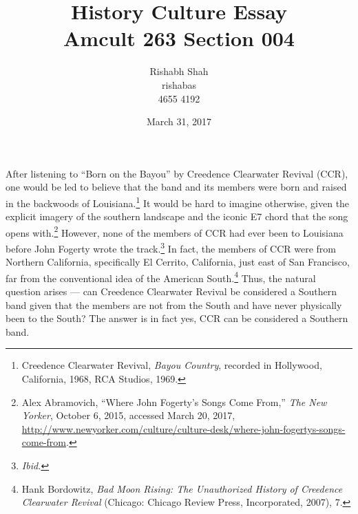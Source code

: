 \documentclass[10pt]{article}
\begin{document}
\title{
	History Culture Essay\\
	Amcult 263 Section 004
	}

\author{
	Rishabh Shah\\
	rishabas\\
	4655 4192\\}

\date{March 31, 2017}

\maketitle
\thispagestyle{empty}

\newpage
\clearpage
{}
\doublespacing

After listening to ``Born on the Bayou'' by Creedence Clearwater Revival (CCR), one would be led to believe that the band and its members were born and raised in the backwoods of Louisiana.\footnote{Creedence Clearwater Revival, \textit{Bayou Country}, recorded in Hollywood, California, 1968, RCA Studios, 1969.} It would be hard to imagine otherwise, given the explicit imagery of the southern landscape and the iconic E7 chord that the song opens with.\footnote{Alex Abramovich, ``Where John Fogerty's Songs Come From,'' \textit{The New Yorker}, October 6, 2015, accessed March 20, 2017, \url{http://www.newyorker.com/culture/culture-desk/where-john-fogertys-songs-come-from}.} However, none of the members of CCR had ever been to Louisiana before John Fogerty wrote the track.\footnote{\textit{Ibid.}} In fact, the members of CCR were from Northern California, specifically El Cerrito, California, just east of San Francisco, far from the conventional idea of the American South.\footnote{Hank Bordowitz, \textit{Bad Moon Rising: The Unauthorized History of Creedence Clearwater Revival} (Chicago: Chicago Review Press, Incorporated, 2007), 7.} Thus, the natural question arises --- can Creedence Clearwater Revival be considered a Southern band given that the members are not from the South and have never physically been to the South? The answer is in fact yes, CCR can be considered a Southern band.
\end{document}
